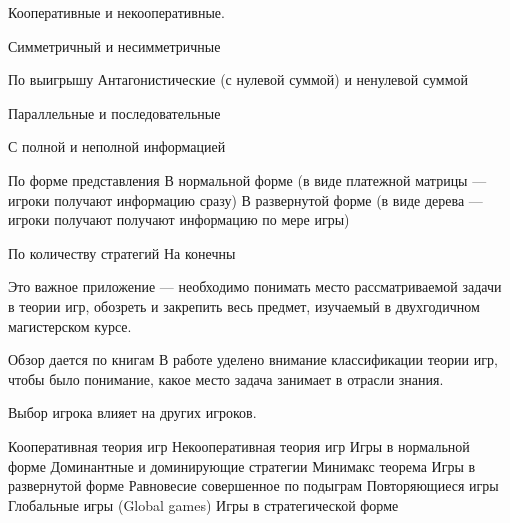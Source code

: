 Кооперативные и некооперативные.


Симметричный и несимметричные 

По выигрышу
Антагонистические (с нулевой суммой) и ненулевой суммой

Параллельные и последовательные

С полной и неполной информацией


По форме представления
В нормальной форме (в виде платежной матрицы --- игроки получают информацию сразу)
В развернутой форме (в виде дерева --- игроки получают получают информацию по мере игры)

По количеству стратегий
На конечны

Это важное приложение — необходимо понимать место рассматриваемой задачи в теории игр, обозреть и закрепить весь предмет, изучаемый в двухгодичном магистерском курсе.

Обзор дается по книгам \cite{nisan}
В работе уделено внимание классификации теории игр, чтобы было понимание, какое место задача занимает в отрасли знания.

Выбор игрока влияет на других игроков.

Кооперативная теория игр
Некооперативная теория игр
Игры в нормальной форме
Доминантные и доминирующие стратегии
Минимакс теорема
Игры в развернутой форме
Равновесие совершенное по подыграм
Повторяющиеся игры
Глобальные игры (Global games)
Игры в стратегической форме

